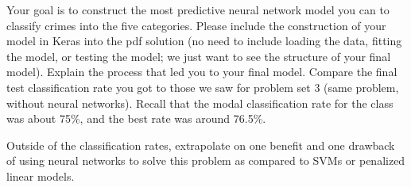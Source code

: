 \documentclass[12pt]{article}
\begin{document}
Your goal is to construct the most predictive neural network model you can to
classify crimes into the five categories. Please include the construction
of your model in Keras into the pdf solution (no need to include loading
the data, fitting the model, or testing the model; we just want to see
the structure of your final model). Explain the process that led you to
your final model. Compare the final test classification rate you got to
those we saw for problem set 3 (same problem, without neural networks).
Recall that the modal classification rate for the class was about 75\%,
and the best rate was around 76.5\%.

Outside of the classification rates, extrapolate on one benefit and one
drawback of using neural networks to solve this problem as compared to
SVMs or penalized linear models.
\end{document}
